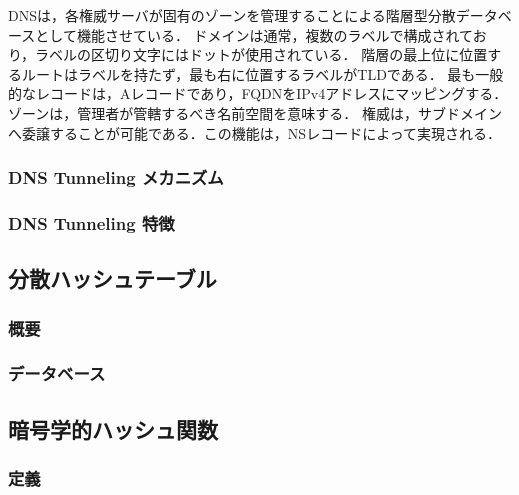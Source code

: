 \documentclass[12pt]{jarticle} %
\begin{document}
DNSは，各権威サーバが固有のゾーンを管理することによる階層型分散データベースとして機能させている．
ドメインは通常，複数のラベルで構成されており，ラベルの区切り文字にはドットが使用されている．
階層の最上位に位置するルートはラベルを持たず，最も右に位置するラベルがTLDである．
最も一般的なレコードは，Aレコードであり，FQDNをIPv4アドレスにマッピングする．
ゾーンは，管理者が管轄するべき名前空間を意味する．
権威は，サブドメインへ委譲することが可能である．この機能は，NSレコードによって実現される．
\subsubsection{DNS Tunneling メカニズム}
\subsubsection{DNS Tunneling 特徴}
\subsection{分散ハッシュテーブル}
\subsubsection{概要}
\subsubsection{データベース}
\subsection{暗号学的ハッシュ関数}
\subsubsection{定義}
\end{document}
